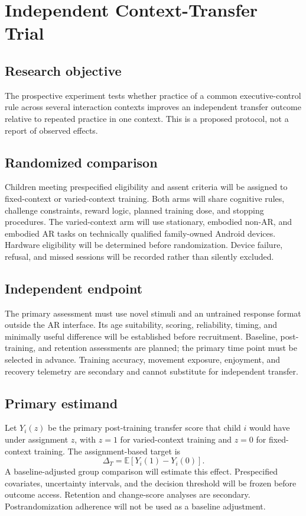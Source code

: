 \section{Independent Context-Transfer Trial}

\subsection{Research objective}
The prospective experiment tests whether practice of a common executive-control rule across several interaction contexts improves an independent transfer outcome relative to repeated practice in one context. This is a proposed protocol, not a report of observed effects.

\subsection{Randomized comparison}
Children meeting prespecified eligibility and assent criteria will be assigned to fixed-context or varied-context training. Both arms will share cognitive rules, challenge constraints, reward logic, planned training dose, and stopping procedures. The varied-context arm will use stationary, embodied non-AR, and embodied AR tasks on technically qualified family-owned Android devices. Hardware eligibility will be determined before randomization. Device failure, refusal, and missed sessions will be recorded rather than silently excluded.

\subsection{Independent endpoint}
The primary assessment must use novel stimuli and an untrained response format outside the AR interface. Its age suitability, scoring, reliability, timing, and minimally useful difference will be established before recruitment. Baseline, post-training, and retention assessments are planned; the primary time point must be selected in advance. Training accuracy, movement exposure, enjoyment, and recovery telemetry are secondary and cannot substitute for independent transfer.

\subsection{Primary estimand}
Let \(Y_i(z)\) be the primary post-training transfer score that child \(i\) would have under assignment \(z\), with \(z=1\) for varied-context training and \(z=0\) for fixed-context training. The assignment-based target is
\[
\Delta_T=\mathbb{E}[Y_i(1)-Y_i(0)].
\]
A baseline-adjusted group comparison will estimate this effect. Prespecified covariates, uncertainty intervals, and the decision threshold will be frozen before outcome access. Retention and change-score analyses are secondary. Postrandomization adherence will not be used as a baseline adjustment.

